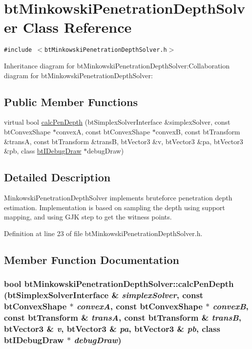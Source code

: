 \hypertarget{classbt_minkowski_penetration_depth_solver}{
\section{btMinkowskiPenetrationDepthSolver Class Reference}
\label{classbt_minkowski_penetration_depth_solver}
}
{\tt \#include $<$btMinkowskiPenetrationDepthSolver.h$>$}

Inheritance diagram for btMinkowskiPenetrationDepthSolver:Collaboration diagram for btMinkowskiPenetrationDepthSolver:\subsection*{Public Member Functions}
\begin{CompactItemize}
\item 
virtual bool \hyperlink{classbt_minkowski_penetration_depth_solver_da75e93337af3d895f0f33f3140361c7}{calcPenDepth} (btSimplexSolverInterface \&simplexSolver, const btConvexShape $\ast$convexA, const btConvexShape $\ast$convexB, const btTransform \&transA, const btTransform \&transB, btVector3 \&v, btVector3 \&pa, btVector3 \&pb, class \hyperlink{classbt_i_debug_draw}{btIDebugDraw} $\ast$debugDraw)
\end{CompactItemize}


\subsection{Detailed Description}
MinkowskiPenetrationDepthSolver implements bruteforce penetration depth estimation. Implementation is based on sampling the depth using support mapping, and using GJK step to get the witness points. 

Definition at line 23 of file btMinkowskiPenetrationDepthSolver.h.

\subsection{Member Function Documentation}
\hypertarget{classbt_minkowski_penetration_depth_solver_da75e93337af3d895f0f33f3140361c7}{
\subsubsection[calcPenDepth]{\setlength{\rightskip}{0pt plus 5cm}bool btMinkowskiPenetrationDepthSolver::calcPenDepth (btSimplexSolverInterface \& {\em simplexSolver}, \/  const btConvexShape $\ast$ {\em convexA}, \/  const btConvexShape $\ast$ {\em convexB}, \/  const btTransform \& {\em transA}, \/  const btTransform \& {\em transB}, \/  btVector3 \& {\em v}, \/  btVector3 \& {\em pa}, \/  btVector3 \& {\em pb}, \/  class {\bf btIDebugDraw} $\ast$ {\em debugDraw})}}
\label{classbt_minkowski_penetration_depth_solver_da75e93337af3d895f0f33f3140361c7}




